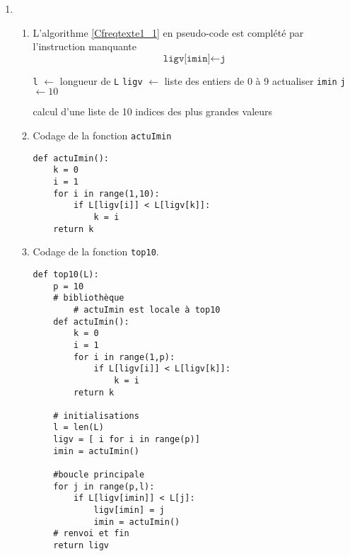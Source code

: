 \begin{enumerate}
  \item 
\begin{enumerate}
  \item L'algorithme \ref{Cfreqtexte1_1} en pseudo-code est complété par l'instruction manquante
\begin{displaymath}
\texttt{ligv[imin]} \leftarrow \texttt{j}  
\end{displaymath}
\begin{algorithm}
  \texttt{l} $\leftarrow$ longueur de \texttt{L}\;
  \texttt{ligv} $\leftarrow$ liste des entiers de 0 à 9\;
  actualiser  \texttt{imin}\;
  \texttt{j} $\leftarrow 10$\;
  \caption{calcul d'une liste de 10 indices des plus grandes valeurs}
  \label{Cfreqtexte1_1}
\end{algorithm}
\item Codage de la fonction \texttt{actuImin}
\begin{verbatim}
def actuImin():
    k = 0
    i = 1
    for i in range(1,10):
        if L[ligv[i]] < L[ligv[k]]:
            k = i
    return k
\end{verbatim}
\item Codage de la fonction \texttt{top10}.
\begin{verbatim}
def top10(L):
    p = 10
    # bibliothèque
        # actuImin est locale à top10
    def actuImin():
        k = 0
        i = 1
        for i in range(1,p):
            if L[ligv[i]] < L[ligv[k]]:
                k = i
        return k
        
    # initialisations
    l = len(L)
    ligv = [ i for i in range(p)]
    imin = actuImin()
    
    #boucle principale
    for j in range(p,l):
        if L[ligv[imin]] < L[j]:
            ligv[imin] = j
            imin = actuImin()
    # renvoi et fin
    return ligv
\end{verbatim}
\end{enumerate}
\end{enumerate}

